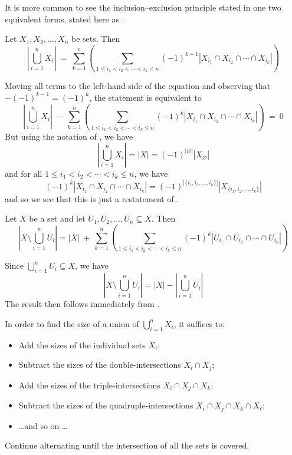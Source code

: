 It is more common to see the inclusion--exclusion principle stated in one two equivalent forms, stated here as .

\begin{corollary}
\label{corIEPSizeOfUnion}
Let $X_1, X_2, \dots, X_n$ be sets. Then
\[ \left| \bigcup_{i=1}^n X_i \right| ~=~ \sum_{k=1}^n \left( \sum_{1 \le i_1 < i_2 < \cdots < i_k \le n} (-1)^{k-1} |X_{i_1} \cap X_{i_2} \cap \cdots \cap X_{i_k}| \right) \]
\end{corollary}

\begin{cproof}
Moving all terms to the left-hand side of the equation and observing that $-(-1)^{k-1} = (-1)^k$, the statement is equivalent to
\[ \left| \bigcup_{i=1}^n X_i \right| ~-~ \sum_{k=1}^n \left( \sum_{1 \le i_1 < i_2 < \cdots < i_k \le n} (-1)^k |X_{i_1} \cap X_{i_2} \cap \cdots \cap X_{i_k}| \right) ~=~ 0 \]
But using the notation of , we have
\[
\left| \bigcup_{i=1}^n X_i \right| = |X| = (-1)^{|\varnothing|} |X_{\varnothing}|
\]
and for all $1 \le i_1 < i_2 < \cdots < i_k \le n$, we have
\[
(-1)^k |X_{i_1} \cap X_{i_2} \cap \cdots \cap X_{i_k}| = (-1)^{|\{i_1,i_2,\dots,i_k\}|} |X_{\{i_1,i_2,\dots,i_k\}}|
\]
and so we see that this is just a restatement of .
\end{cproof}

\begin{corollary}
\label{corIEPSizeOfComplement}
Let $X$ be a set and let $U_1, U_2, \dots, U_n \subseteq X$. Then
\[
\left| X \setminus \bigcup_{i=1}^n U_i \right| = |X| ~+~ \sum_{k=1}^n \left( \sum_{1 \le i_1 < i_2 < \cdots < i_k \le n} (-1)^k |U_{i_1} \cap U_{i_2} \cap \cdots \cap U_{i_k}| \right)
\]
\end{corollary}

\begin{cproof}
Since $\bigcup_{i=1}^n U_i \subseteq X$, we have
\[
\left| X \setminus \bigcup_{i=1}^n U_i \right| = |X| - \left| \bigcup_{i=1}^n U_i \right|
\]
The result then follows immediately from .
\end{cproof}

\begin{strategy}
In order to find the size of a union of $\bigcup_{i=1}^n X_i$, it suffices to:
\begin{itemize}
\item Add the sizes of the individual sets $X_i$;
\item Subtract the sizes of the double-intersections $X_i \cap X_j$;
\item Add the sizes of the triple-intersections $X_i \cap X_j \cap X_k$;
\item Subtract the sizes of the quadruple-intersections $X_i \cap X_j \cap X_k \cap X_{\ell}$;
\item \dots and so on \dots
\end{itemize}
Continue alternating until the intersection of all the sets is covered.
\end{strategy}

